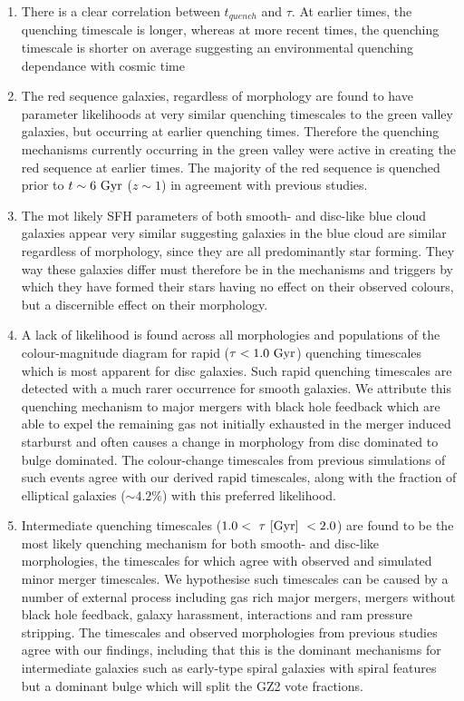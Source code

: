 \documentclass[useAMS,usenatbib]{mn2e}
\begin{document}
\begin{enumerate}
\item There is a clear correlation between $t_{quench}$ and $\tau$. At earlier times, the quenching timescale is longer, whereas at more recent times, the quenching timescale is shorter on average suggesting an environmental quenching dependance with cosmic time
\item The red sequence galaxies, regardless of morphology are found to have parameter likelihoods at very similar quenching timescales to the green valley galaxies, but occurring at earlier quenching times. Therefore the quenching mechanisms currently occurring in the green valley were active in creating the red sequence at earlier times. The majority of the red sequence is quenched prior to $t\sim 6~\rm{Gyr}$ ($z\sim1$) in agreement with previous studies.
\item The mot likely SFH parameters of both smooth- and disc-like blue cloud galaxies appear very similar suggesting galaxies in the blue cloud are similar regardless of morphology, since they are all predominantly star forming. They way these galaxies differ must therefore be in the mechanisms and triggers by which they have formed their stars having no effect on their observed colours, but a discernible effect on their morphology.
\item A lack of likelihood is found across all morphologies and populations of the colour-magnitude diagram for rapid ($\tau < 1.0~\rm{Gyr}$) quenching timescales which is most apparent for disc galaxies. Such rapid quenching timescales are detected with a much rarer occurrence for smooth galaxies. We attribute this quenching mechanism to major mergers with black hole feedback which are able to expel the remaining gas not initially exhausted in the merger induced starburst and often causes a change in morphology from disc dominated to bulge dominated. The colour-change timescales from previous simulations of such events agree with our derived rapid timescales, along with the fraction of elliptical galaxies ($\sim 4.2\%$) with this preferred likelihood.
\item Intermediate quenching timescales ($1.0 < ~\tau~\rm{[Gyr]}~ < 2.0 $) are found to be the most likely quenching mechanism for both smooth- and disc-like morphologies, the timescales for which agree with observed and simulated minor merger timescales. We hypothesise such timescales can be caused by a number of external process including gas rich major mergers, mergers without black hole feedback, galaxy harassment, interactions and ram pressure stripping. The timescales and observed morphologies from previous studies agree with our findings, including that this is the dominant mechanisms for intermediate galaxies such as early-type spiral galaxies with spiral features but a dominant bulge which will split the GZ2 vote fractions. 

\end{enumerate}
\end{document}
